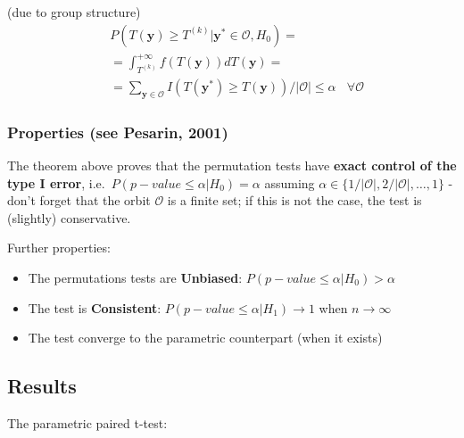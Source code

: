 \documentclass[
]{article}
\newenvironment{Shaded}{\begin{snugshade}}{\end{snugshade}}
\newcommand{\FunctionTok}[1]{\textcolor[rgb]{0.00,0.00,0.00}{#1}}
\newcommand{\NormalTok}[1]{#1}
\newcommand{\SpecialCharTok}[1]{\textcolor[rgb]{0.00,0.00,0.00}{#1}}
\newcommand{\StringTok}[1]{\textcolor[rgb]{0.31,0.60,0.02}{#1}}
\providecommand{\tightlist}{%
  \setlength{\itemsep}{0pt}\setlength{\parskip}{0pt}}
\begin{document}
(due to group structure) \[
\begin{aligned}
&P(T(\mathbf{y})\geq T^{(k)} | \mathbf{y}^*\in\mathcal{O}, H_0)=\\
&=\int_{T^{(k)}}^{+\infty} f(T(\mathbf{y}))dT(\mathbf{y})=\\
&=\sum_{\mathbf{y}\in\mathcal{O}} I(T(\mathbf{y}^*)\geq T(\mathbf{y}))/|\mathcal{O}|\leq \alpha
\ \ \ \ \forall\mathcal{O}
\end{aligned}
\]

\hypertarget{properties-see-pesarin-2001}{%
\subsubsection{Properties (see Pesarin,
2001)}\label{properties-see-pesarin-2001}}

The theorem above proves that the permutation tests have \textbf{exact
control of the type I error}, i.e.~\(P(p-value\leq \alpha|H_0)=\alpha\)
assuming \(\alpha\in \{1/|\mathcal{O}|,2/|\mathcal{O}|,\ldots,1\}\) -
don't forget that the orbit \(\mathcal{O}\) is a finite set; if this is
not the case, the test is (slightly) conservative.

Further properties:

\begin{itemize}
\tightlist
\item
  The permutations tests are \textbf{Unbiased}:
  \(P(p-value\leq \alpha|H_0)>\alpha\)\\
\item
  The test is \textbf{Consistent}: \(P(p-value\leq \alpha|H_1)\to 1\)
  when \(n\to\infty\)\\
\item
  The test converge to the parametric counterpart (when it exists)
\end{itemize}

\hypertarget{results}{%
\subsection{Results}\label{results}}

The parametric paired t-test:

\begin{Shaded}
\end{Shaded}
\end{document}

